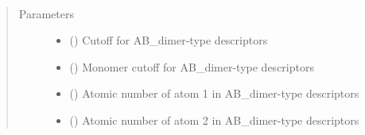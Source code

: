 \documentclass[letterpaper,10pt,english]{sphinxmanual}
\begin{document}
\begin{fulllineitems}
\label{\detokenize{descriptors:gap.descriptors.AB_dimer}}~\begin{quote}\begin{description}
\item[{Parameters}] \leavevmode\begin{itemize}
\item {} 
 () \textendash{} Cutoff for AB\_dimer-type descriptors

\item {} 
 () \textendash{} Monomer cutoff for AB\_dimer-type descriptors

\item {} 
 () \textendash{} Atomic number of atom 1 in AB\_dimer-type descriptors

\item {} 
 () \textendash{} Atomic number of atom 2 in AB\_dimer-type descriptors

\end{itemize}

\end{description}\end{quote}

\end{fulllineitems}

\end{document}
